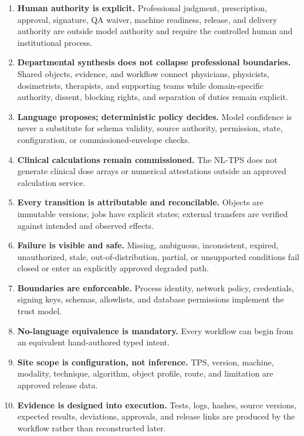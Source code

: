\documentclass[11pt,letterpaper]{article}
\begin{document}
\begin{enumerate}
\item \textbf{Human authority is explicit.} Professional judgment, prescription, approval, signature, QA waiver, machine readiness, release, and delivery authority are outside model authority and require the controlled human and institutional process.
\item \textbf{Departmental synthesis does not collapse professional boundaries.} Shared objects, evidence, and workflow connect physicians, physicists, dosimetrists, therapists, and supporting teams while domain-specific authority, dissent, blocking rights, and separation of duties remain explicit.
\item \textbf{Language proposes; deterministic policy decides.} Model confidence is never a substitute for schema validity, source authority, permission, state, configuration, or commissioned-envelope checks.
\item \textbf{Clinical calculations remain commissioned.} The NL-TPS does not generate clinical dose arrays or numerical attestations outside an approved calculation service.
\item \textbf{Every transition is attributable and reconcilable.} Objects are immutable versions; jobs have explicit states; external transfers are verified against intended and observed effects.
\item \textbf{Failure is visible and safe.} Missing, ambiguous, inconsistent, expired, unauthorized, stale, out-of-distribution, partial, or unsupported conditions fail closed or enter an explicitly approved degraded path.
\item \textbf{Boundaries are enforceable.} Process identity, network policy, credentials, signing keys, schemas, allowlists, and database permissions implement the trust model.
\item \textbf{No-language equivalence is mandatory.} Every workflow can begin from an equivalent hand-authored typed intent.
\item \textbf{Site scope is configuration, not inference.} TPS, version, machine, modality, technique, algorithm, object profile, route, and limitation are approved release data.
\item \textbf{Evidence is designed into execution.} Tests, logs, hashes, source versions, expected results, deviations, approvals, and release links are produced by the workflow rather than reconstructed later.
\end{enumerate}
\end{document}
